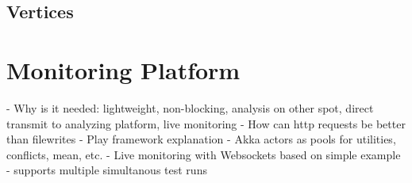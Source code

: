 \subsection{Vertices}

\section{Monitoring Platform}

    - Why is it needed: lightweight, non-blocking, analysis on other spot, direct transmit to analyzing platform, live monitoring
    - How can http requests be better than filewrites
    - Play framework explanation
- Akka actors as pools for utilities, conflicts, mean, etc.
- Live monitoring with Websockets based on simple example
- supports multiple simultanous test runs
